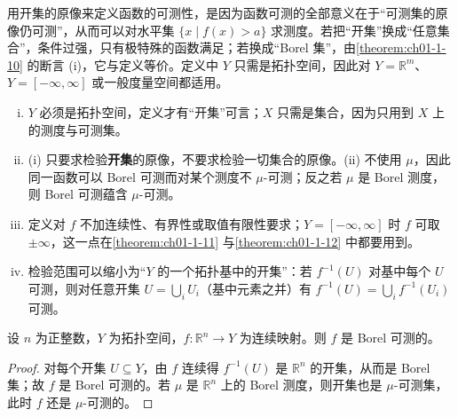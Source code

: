 \documentclass[../../main.tex]{subfiles}
\begin{document}
\begin{remark}\label{remark:ch01-def-1-10-函数动机}
用开集的原像来定义函数的可测性，是因为函数可测的全部意义在于“可测集的原像仍可测”，从而可以对水平集 $\{x\mid f(x)>a\}$ 求测度。若把“开集”换成“任意集合”，条件过强，只有极特殊的函数满足；若换成“Borel 集”，由\cref{theorem:ch01-1-10} 的断言 (i)，它与定义等价。定义中 $Y$ 只需是拓扑空间，因此对 $Y=\mathbb{R}^{m}$、$Y=[-\infty,\infty]$ 或一般度量空间都适用。%
\end{remark}

\begin{remark}\label{remark:ch01-def-1-10-函数条件}
\begin{enumerate}[(i)]
\item $Y$ 必须是拓扑空间，定义才有“开集”可言；$X$ 只需是集合，因为只用到 $X$ 上的测度与可测集。
\item (i) 只要求检验\textbf{开集}的原像，不要求检验一切集合的原像。(ii) 不使用 $\mu$，因此同一函数可以 Borel 可测而对某个测度不 $\mu$-可测；反之若 $\mu$ 是 Borel 测度，则 Borel 可测蕴含 $\mu$-可测。
\item 定义对 $f$ 不加连续性、有界性或取值有限性要求；$Y=[-\infty,\infty]$ 时 $f$ 可取 $\pm\infty$，这一点在\cref{theorem:ch01-1-11} 与\cref{theorem:ch01-1-12} 中都要用到。%
\item 检验范围可以缩小为“$Y$ 的一个拓扑基中的开集”：若 $f^{-1}(U)$ 对基中每个 $U$ 可测，则对任意开集 $U=\bigcup_{i}U_{i}$（基中元素之并）有 $f^{-1}(U)=\bigcup_{i}f^{-1}(U_{i})$ 可测。
\end{enumerate}
\end{remark}

\begin{example}\label{example:ch01-1-10-连续}
设 $n$ 为正整数，$Y$ 为拓扑空间，$f:\mathbb{R}^{n}\to Y$ 为连续映射。则 $f$ 是 Borel 可测的。
\end{example}

\begin{proof}
对每个开集 $U\subseteq Y$，由 $f$ 连续得 $f^{-1}(U)$ 是 $\mathbb{R}^{n}$ 的开集，从而是 Borel 集；故 $f$ 是 Borel 可测的。若 $\mu$ 是 $\mathbb{R}^{n}$ 上的 Borel 测度，则开集也是 $\mu$-可测集，此时 $f$ 还是 $\mu$-可测的。
\end{proof}
\end{document}
